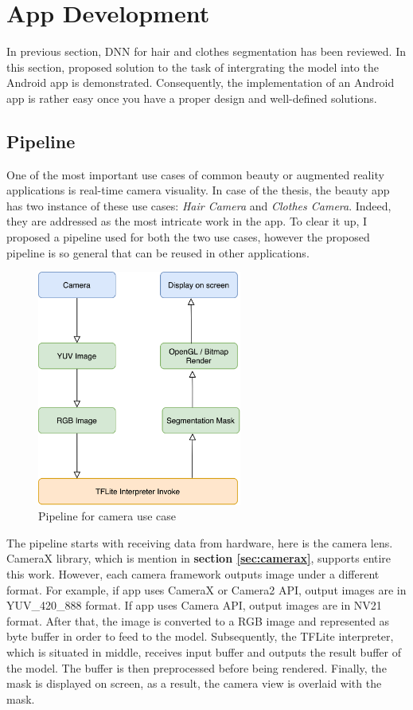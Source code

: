 

\section{App Development}  \label{androidapp}
In previous section, DNN for hair and clothes segmentation has been reviewed. In this section, proposed solution to the task of intergrating the model into the Android app is demonstrated. Consequently, the implementation of an Android app is rather easy once you have a proper design and well-defined solutions. 
\subsection{Pipeline}
One of the most important use cases of common beauty or augmented reality applications is real-time camera visuality. In case of the thesis, the beauty app has two instance of these use cases: \emph{Hair Camera} and \emph{Clothes Camera}. Indeed, they are addressed as the most intricate work in the app. To clear it up, I proposed a pipeline used for both the two use cases, however the proposed pipeline is so general that can be reused in other applications.  

\vspace{3mm}
\begin{figure} [H]
    \centering
    \includegraphics[width=0.6\textwidth]{chapter3/image/apppipeline.png}
    \caption{Pipeline for camera use case}
    \label{fig:my_label}
\end{figure}
 
The pipeline starts with receiving data from hardware, here is the camera lens. CameraX library, which is mention in \textbf{section \ref{sec:camerax}}, supports entire this work.  However, each camera framework outputs image under a different format. For example, if app uses CameraX or Camera2 API, output images are in YUV\_420\_888 format. If app uses Camera API, output images are in NV21 format. After that, the image is converted to a RGB image and represented as byte buffer in order to feed to the model. Subsequently, the TFLite interpreter, which is situated in middle, receives input buffer and outputs the result buffer of the model. The buffer is then preprocessed before being rendered. Finally, the mask is displayed on screen, as a result, the camera view is overlaid with the mask.

